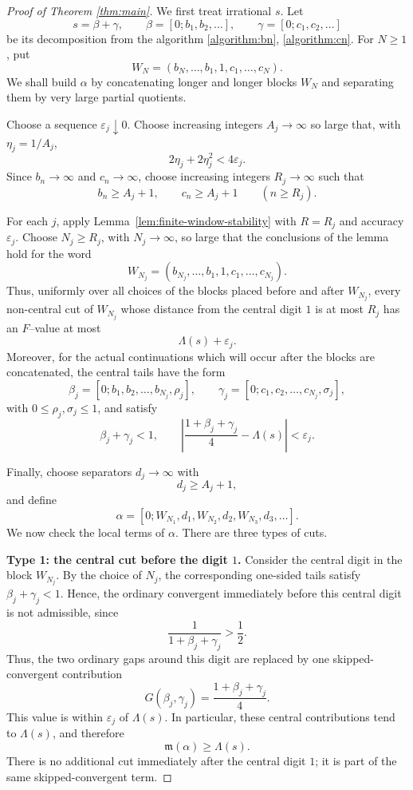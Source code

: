 \documentclass[11pt]{amsart}
\begin{document}
\begin{proof}[Proof of Theorem \ref{thm:main}]
We first treat irrational $s$.  Let
$$
        s=\beta+\gamma,
        \qquad
        \beta=[0;b_1,b_2,\ldots],
        \qquad
        \gamma=[0;c_1,c_2,\ldots]
$$
be its decomposition from the algorithm \eqref{algorithm:bn}, \eqref{algorithm:cn}.  For $N\ge1$, put
$$
        W_N=(b_N,\ldots,b_1,1,c_1,\ldots,c_N).
$$
We shall build $\alpha$ by concatenating longer and longer blocks $W_N$ and separating them by very large partial quotients.

Choose a sequence $\varepsilon_j\downarrow0$.  Choose increasing integers
$A_j\to\infty$ so large that, with $\eta_j=1/A_j$,
$$
        2\eta_j+2\eta_j^2<4\varepsilon_j.
$$
Since $b_n\to\infty$ and $c_n\to\infty$, choose increasing integers
$R_j\to\infty$ such that
$$
        b_n\ge A_j+1,
        \qquad
        c_n\ge A_j+1
        \qquad(n\ge R_j).
$$


For each $j$, apply Lemma~\ref{lem:finite-window-stability} with $R=R_j$ and accuracy $\varepsilon_j$. Choose $N_j\ge R_j$, with $N_j\to\infty$, so large that the conclusions of the lemma hold for the word
$$
        W_{N_j}=(b_{N_j},\ldots,b_1,1,c_1,\ldots,c_{N_j}).
$$
Thus, uniformly over all choices of the blocks placed before and after $W_{N_j}$, every non-central cut of $W_{N_j}$ whose distance from the central digit $1$ is at most $R_j$ has an $F$--value at most
$$
        \Lambda(s)+\varepsilon_j.
$$
Moreover, for the actual continuations which will occur after the blocks are concatenated, the central tails have the form
$$
        \beta_j=[0;b_1,b_2,\ldots,b_{N_j},\rho_j],
        \qquad
        \gamma_j=[0;c_1,c_2,\ldots,c_{N_j},\sigma_j],
$$
with $0\le \rho_j,\sigma_j\le 1$, and satisfy
$$
        \beta_j+\gamma_j<1,
        \qquad
        \left|\frac{1+\beta_j+\gamma_j}{4}-\Lambda(s)\right|<\varepsilon_j.
$$




Finally, choose separators $d_j\to\infty$ with
$$
        d_j\ge A_j+1,
$$
and define
$$
        \alpha=[0;W_{N_1},d_1,W_{N_2},d_2,W_{N_3},d_3,\ldots].
$$
We now check the local terms of $\alpha$.  There are three types of cuts.

\textbf{Type 1: the central cut before the digit $1$.}
Consider the central digit in the block $W_{N_j}$.  By the choice of $N_j$, the corresponding one-sided tails satisfy $\beta_j+\gamma_j<1$.  Hence, the ordinary convergent immediately before this central digit is not admissible, since
$$
        \frac{1}{1+\beta_j+\gamma_j}
        >\frac12.
$$
Thus, the two ordinary gaps around this digit are replaced by one skipped-convergent contribution
$$
        G(\beta_j,\gamma_j)
        =\frac{1+\beta_j+\gamma_j}{4}.
$$
This value is within $\varepsilon_j$ of $\Lambda(s)$.  In particular, these central contributions tend to $\Lambda(s)$, and therefore
$$
        \mathfrak m(\alpha)\ge \Lambda(s).
$$
There is no additional cut immediately after the central digit $1$; it is part of the same skipped-convergent term.


\end{proof}
\end{document}
